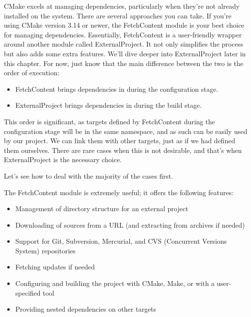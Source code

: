 
CMake excels at managing dependencies, particularly when they’re not already installed on the system. There are several approaches you can take. If you’re using CMake version 3.14 or newer, the FetchContent module is your best choice for managing dependencies. Essentially, FetchContent is a user-friendly wrapper around another module called ExternalProject. It not only simplifies the process but also adds some extra features. We’ll dive deeper into ExternalProject later in this chapter. For now, just know that the main difference between the two is the order of execution:

\begin{itemize}
\item
FetchContent brings dependencies in during the configuration stage.

\item
ExternalProject brings dependencies in during the build stage.
\end{itemize}

This order is significant, as targets defined by FetchContent during the configuration stage will be in the same namespace, and as such can be easily used by our project. We can link them with other targets, just as if we had defined them ourselves. There are rare cases when this is not desirable, and that’s when ExternalProject is the necessary choice.

Let’s see how to deal with the majority of the cases first.


The FetchContent module is extremely useful; it offers the following features:

\begin{itemize}
\item
Management of directory structure for an external project

\item
Downloading of sources from a URL (and extracting from archives if needed)

\item
Support for Git, Subversion, Mercurial, and CVS (Concurrent Versions System) repositories

\item
Fetching updates if needed

\item
Configuring and building the project with CMake, Make, or with a user-specified tool

\item
Providing nested dependencies on other targets
\end{itemize}

